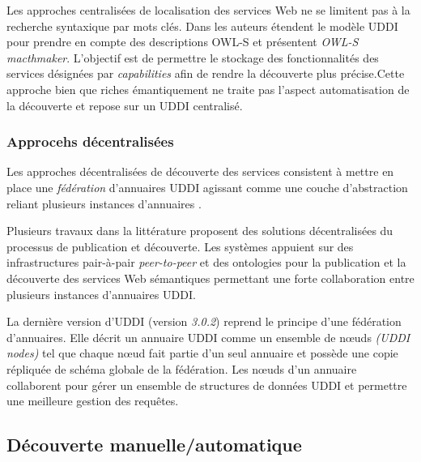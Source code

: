    Les approches centralisées de localisation des services Web ne se
    limitent pas à la recherche syntaxique par mots clés. Dans
    \cite{srinivasan2004adding} les auteurs étendent le modèle
    \textsc{UDDI} pour prendre en compte des descriptions
    \textsc{OWL-S} et présentent \textit{OWL-S macthmaker}. L'objectif
    est de permettre le stockage des fonctionnalités des services
    désignées par \textit{capabilities} afin de rendre la découverte
    plus précise.Cette approche bien que riches émantiquement ne
    traite pas l'aspect automatisation de la découverte et repose sur
    un \textsc{UDDI} centralisé.

    \subsubsection{Approcehs décentralisées}
    \label{sec:decentr-disc}

    Les approches décentralisées de découverte des services consistent
    à mettre en place une \textit{fédération} d'annuaires
    \textsc{UDDI} agissant comme une couche d'abstraction reliant
    plusieurs instances d'annuaires \cite {rompothong2003query,
      sivashanmugam2004discovery}.

    Plusieurs travaux dans la littérature proposent des solutions
    décentralisées du processus de publication et découverte. Les
    systèmes \cite{paolucci2003using, schmidt2004peer,
      verma2005meteor} appuient sur des infrastructures pair-à-pair
    \textit{peer-to-peer} et des ontologies pour la publication et la
    découverte des services Web sémantiques permettant une forte
    collaboration entre plusieurs instances d'annuaires \textsc{UDDI}.

    La dernière version d'\textsc{UDDI} \cite{oasis2005specification}
    (version \textit{3.0.2}) reprend le principe d'une fédération
    d'annuaires. Elle décrit un annuaire \textsc{UDDI} comme un
    ensemble de nœuds \textit{(UDDI nodes)} tel que chaque nœud fait
    partie d'un seul annuaire et possède une copie répliquée de schéma
    globale de la fédération. Les nœuds d'un annuaire collaborent pour
    gérer un ensemble de structures de données \textsc{UDDI} et
    permettre une meilleure gestion des requêtes.

  \subsection{Découverte manuelle/automatique}
  \label{sec:ws-desc:manual-vs-auto}

